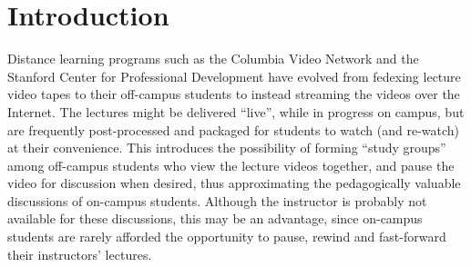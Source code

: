 \documentclass{sig-alternate}
\begin{document}








\section{Introduction}



Distance learning programs such as the Columbia Video Network and the
Stanford Center for Professional Development have evolved from
fedexing lecture video tapes to their off-campus students to instead
streaming the videos over the Internet.  The lectures might be
delivered ``live'', while in progress on campus, but are frequently
post-processed and packaged for students to watch (and re-watch) at
their convenience.  This introduces the possibility of forming ``study
groups'' among off-campus students who view the lecture videos
together, and pause the video for discussion when desired, thus
approximating the pedagogically valuable discussions of on-campus
students.  Although the instructor is probably not available for these
discussions, this may be an advantage, since on-campus students are
rarely afforded the opportunity to pause, rewind and fast-forward
their instructors' lectures.
\end{document}
